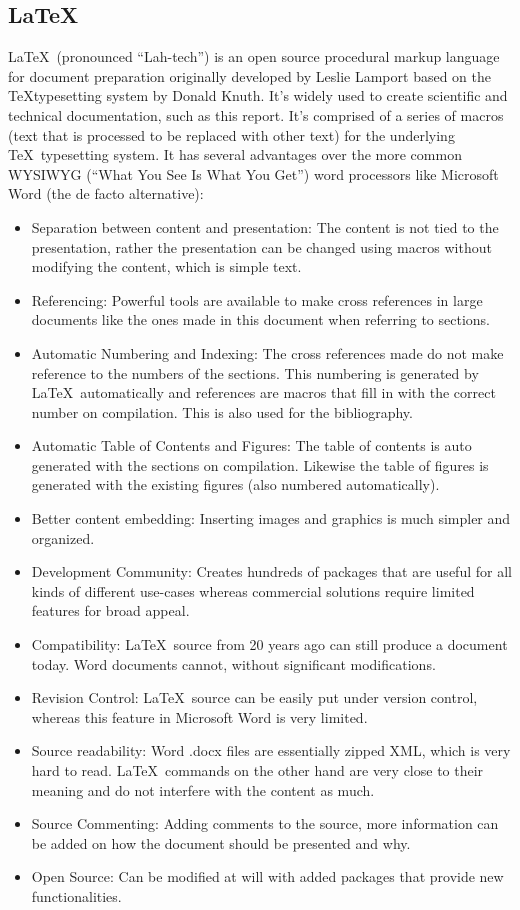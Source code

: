 \subsection{\LaTeX}
\LaTeX\ (pronounced ``Lah-tech'') is an open source procedural markup language for document preparation originally developed by Leslie
Lamport based on the \TeX typesetting system by Donald Knuth. It's widely used to create scientific and technical documentation, such as
this report. It's comprised of a series of macros (text that is processed to be replaced with other text) for the underlying \TeX\
typesetting system. It has several advantages over the more common WYSIWYG (``What You See Is What You Get'') word processors like
Microsoft Word (the de facto alternative):
\begin{itemize}
  \item Separation between content and presentation: The content is not tied to the presentation, rather the presentation can be changed
  using macros without modifying the content, which is simple text.
  \item Referencing: Powerful tools are available to make cross references in large documents like the ones made in this document when
  referring to sections.
  \item Automatic Numbering and Indexing: The cross references made do not make reference to the numbers of the sections. This numbering
  is generated by \LaTeX\ automatically and references are macros that fill in with the correct number on compilation. This is also used
  for the bibliography.
  \item Automatic Table of Contents and Figures: The table of contents is auto generated with the sections on compilation. Likewise the
  table of figures is generated with the existing figures (also numbered automatically).
  \item Better content embedding: Inserting images and graphics is much simpler and organized.
  \item Development Community: Creates hundreds of packages that are useful for all kinds of different use-cases whereas commercial
  solutions require limited features for broad appeal.
  \item Compatibility: \LaTeX\ source from 20 years ago can still produce a document today. Word documents cannot, without significant
  modifications.
  \item Revision Control: \LaTeX\ source can be easily put under version control, whereas this feature in Microsoft Word is very limited.
  \item Source readability: Word .docx files are essentially zipped XML, which is very hard to read. \LaTeX\ commands on the other hand
  are very close to their meaning and do not interfere with the content as much.
  \item Source Commenting: Adding comments to the source, more information can be added on how the document should be presented and why.
  \item Open Source: Can be modified at will with added packages that provide new functionalities.
\end{itemize}
